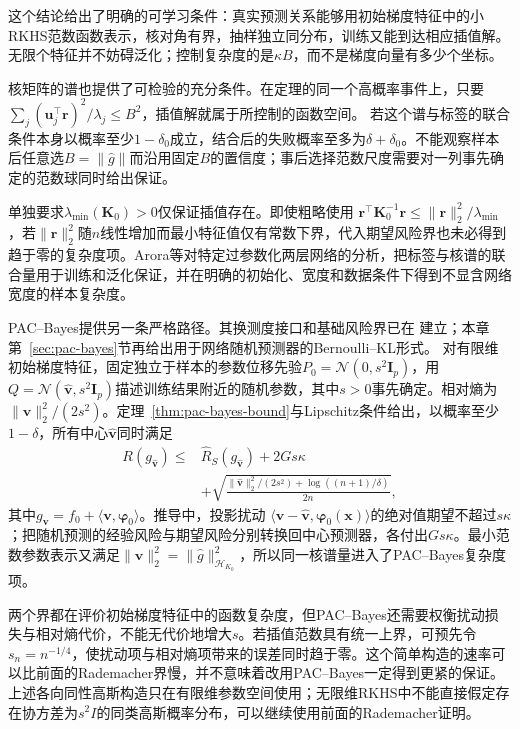 这个结论给出了明确的可学习条件：真实预测关系能够用初始梯度特征中的小RKHS范数函数表示，核对角有界，抽样独立同分布，训练又能到达相应插值解。无限个特征并不妨碍泛化；控制复杂度的是$\kappa B$，而不是梯度向量有多少个坐标。

核矩阵的谱也提供了可检验的充分条件。在定理的同一个高概率事件上，只要
$\sum_j(\bm u_j^\top\bm r)^2/\lambda_j\leq B^2$，插值解就属于所控制的函数空间。
若这个谱与标签的联合条件本身以概率至少$1-\delta_0$成立，结合后的失败概率至多为$\delta+\delta_0$。不能观察样本后任意选$B=\|\widehat g\|$而沿用固定$B$的置信度；事后选择范数尺度需要对一列事先确定的范数球同时给出保证。

单独要求$\lambda_{\min}(\bm K_0)>0$仅保证插值存在。即使粗略使用
$\bm r^\top\bm K_0^{-1}\bm r\leq\|\bm r\|_2^2/\lambda_{\min}$，若$\|\bm r\|_2^2$随$n$线性增加而最小特征值仅有常数下界，代入期望风险界也未必得到趋于零的复杂度项。Arora等对特定过参数化两层网络的分析，把标签与核谱的联合量用于训练和泛化保证，并在明确的初始化、宽度和数据条件下得到不显含网络宽度的样本复杂度。

PAC--Bayes提供另一条严格路径。其换测度接口和基础风险界已在
建立；本章第~\ref{sec:pac-bayes}节再给出用于网络随机预测器的Bernoulli--KL形式。
对有限维初始梯度特征，固定独立于样本的参数位移先验$P_0=\mathcal N(0,s^2\bm I_p)$，用
$Q=\mathcal N(\widehat{\bm v},s^2\bm I_p)$描述训练结果附近的随机参数，其中$s>0$事先确定。相对熵为$\|\widehat{\bm v}\|_2^2/(2s^2)$。定理~\ref{thm:pac-bayes-bound}与Lipschitz条件给出，以概率至少$1-\delta$，所有中心$\widehat{\bm v}$同时满足
\begin{equation}
 \begin{aligned}
 R(g_{\widehat{\bm v}})\leq{}&\hat R_S(g_{\widehat{\bm v}})+2Gs\kappa\\
 &+\sqrt{\frac{\|\widehat{\bm v}\|_2^2/(2s^2)+\log((n+1)/\delta)}{2n}},
 \end{aligned}
 \label{eq:ntk-pac-bayes-risk}
\end{equation}
其中$g_{\bm v}=f_0+\langle\bm v,\bm\varphi_0\rangle$。推导中，投影扰动
$\langle\bm v-\widehat{\bm v},\bm\varphi_0(\bm x)\rangle$的绝对值期望不超过$s\kappa$；把随机预测的经验风险与期望风险分别转换回中心预测器，各付出$Gs\kappa$。最小范数参数表示又满足$\|\widehat{\bm v}\|_2^2=\|\widehat g\|_{\mathcal H_{K_0}}^2$，所以同一核谱量进入了PAC--Bayes复杂度项。

两个界都在评价初始梯度特征中的函数复杂度，但PAC--Bayes还需要权衡扰动损失与相对熵代价，不能无代价地增大$s$。若插值范数具有统一上界，可预先令$s_n=n^{-1/4}$，使扰动项与相对熵项带来的误差同时趋于零。这个简单构造的速率可以比前面的Rademacher界慢，并不意味着改用PAC--Bayes一定得到更紧的保证。上述各向同性高斯构造只在有限维参数空间使用；无限维RKHS中不能直接假定存在协方差为$s^2I$的同类高斯概率分布，可以继续使用前面的Rademacher证明。

